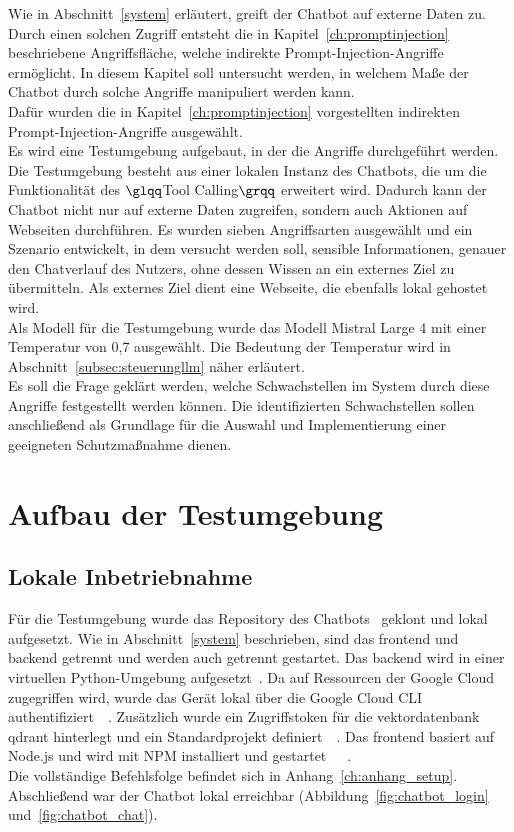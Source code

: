 Wie in Abschnitt~\ref{system} erläutert, greift der Chatbot auf externe Daten zu. Durch einen solchen Zugriff entsteht die in Kapitel~\ref{ch:promptinjection} 
beschriebene Angriffsfläche, welche indirekte Prompt-Injection-Angriffe ermöglicht. In diesem Kapitel soll untersucht werden, in welchem Maße der Chatbot durch solche 
Angriffe manipuliert werden kann. \\
Dafür wurden die in Kapitel~\ref{ch:promptinjection} vorgestellten indirekten Prompt-Injection-Angriffe ausgewählt. \\
Es wird eine Testumgebung aufgebaut, in der die Angriffe durchgeführt werden. Die Testumgebung besteht aus einer lokalen Instanz des Chatbots,
die um die Funktionalität des  $\glqq$Tool Calling$\grqq$ erweitert wird. Dadurch kann der Chatbot nicht nur auf externe Daten zugreifen, sondern auch
Aktionen auf Webseiten durchführen. Es wurden sieben Angriffsarten ausgewählt und ein Szenario entwickelt, in dem versucht werden soll, sensible Informationen,
genauer den Chatverlauf des Nutzers, ohne dessen Wissen an ein externes Ziel zu übermitteln. Als externes Ziel dient eine Webseite,
die ebenfalls lokal gehostet wird. \\
Als Modell für die Testumgebung wurde das Modell Mistral Large 4 mit einer Temperatur von 0,7 ausgewählt. Die Bedeutung der Temperatur wird in 
Abschnitt~\ref{subsec:steuerungllm} näher erläutert. \\
Es soll die Frage geklärt werden, welche Schwachstellen im System durch diese Angriffe festgestellt werden können. Die identifizierten Schwachstellen sollen anschließend 
als Grundlage für die Auswahl und Implementierung einer geeigneten Schutzmaßnahme dienen.

\section{Aufbau der Testumgebung}\label{sec:einrichtung}

\subsection{Lokale Inbetriebnahme}

Für die Testumgebung wurde das Repository des Chatbots~\cite{an17} geklont und lokal aufgesetzt. Wie in Abschnitt~\ref{system} beschrieben, sind das \gls{frontend} und 
\gls{backend} getrennt und werden auch getrennt gestartet. Das \gls{backend} wird in einer virtuellen Python-Umgebung aufgesetzt~\cite{an1}. Da auf Ressourcen der Google Cloud 
zugegriffen wird, wurde das Gerät lokal über die Google Cloud CLI authentifiziert~\cite{an4}~\cite{an6}. Zusätzlich wurde ein Zugriffstoken für die \gls{vektordatenbank} 
\gls{qdrant} hinterlegt und ein Standardprojekt definiert~\cite{an6}~\cite{an7}. Das \gls{frontend} basiert auf Node.js und wird mit NPM installiert und 
gestartet~\cite{an10}~\cite{an12}~\cite{an31}. \\
Die vollständige Befehlsfolge befindet sich in Anhang~\ref{ch:anhang_setup}. \\
Abschließend war der Chatbot lokal erreichbar (Abbildung~\ref{fig:chatbot_login} und~\ref{fig:chatbot_chat}).

